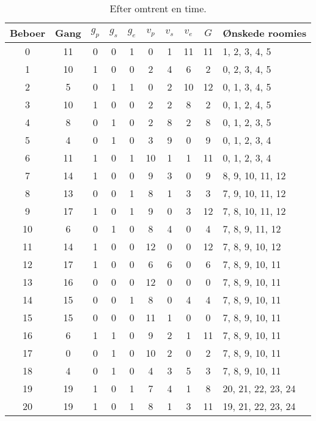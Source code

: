 \documentclass[article,oneside,11pt,a4paper]{memoir}
\newenvironment{assignment}[1]{
\begin{table}[h]
\caption{#1}
\footnotesize
\begin{center}
\begin{tabular}{cccccccccl}
\toprule
Beboer & Gang & $g_p$ & $g_s$ & $g_e$ & $v_p$ & $v_s$ & $v_e$ & $G$ & Ønskede roomies \\ \midrule
}{
\bottomrule
\end{tabular}
\end{center}
\end{table}

}
\begin{document}
\begin{assignment}{Efter omtrent en time.}
     0 &   11 &   0 &   0 &   1 &   0 &   1 &  11 & 11 &  1,  2,  3,  4,  5 \\
     1 &   10 &   1 &   0 &   0 &   2 &   4 &   6 &  2 &  0,  2,  3,  4,  5 \\
     2 &    5 &   0 &   1 &   1 &   0 &   2 &  10 & 12 &  0,  1,  3,  4,  5 \\
     3 &   10 &   1 &   0 &   0 &   2 &   2 &   8 &  2 &  0,  1,  2,  4,  5 \\
     4 &    8 &   0 &   1 &   0 &   2 &   8 &   2 &  8 &  0,  1,  2,  3,  5 \\
     5 &    4 &   0 &   1 &   0 &   3 &   9 &   0 &  9 &  0,  1,  2,  3,  4 \\
     6 &   11 &   1 &   0 &   1 &  10 &   1 &   1 & 11 &  0,  1,  2,  3,  4 \\ \midrule
     7 &   14 &   1 &   0 &   0 &   9 &   3 &   0 &  9 &  8,  9, 10, 11, 12 \\
     8 &   13 &   0 &   0 &   1 &   8 &   1 &   3 &  3 &  7,  9, 10, 11, 12 \\
     9 &   17 &   1 &   0 &   1 &   9 &   0 &   3 & 12 &  7,  8, 10, 11, 12 \\
    10 &    6 &   0 &   1 &   0 &   8 &   4 &   0 &  4 &  7,  8,  9, 11, 12 \\
    11 &   14 &   1 &   0 &   0 &  12 &   0 &   0 & 12 &  7,  8,  9, 10, 12 \\
    12 &   17 &   1 &   0 &   0 &   6 &   6 &   0 &  6 &  7,  8,  9, 10, 11 \\
    13 &   16 &   0 &   0 &   0 &  12 &   0 &   0 &  0 &  7,  8,  9, 10, 11 \\
    14 &   15 &   0 &   0 &   1 &   8 &   0 &   4 &  4 &  7,  8,  9, 10, 11 \\
    15 &   15 &   0 &   0 &   0 &  11 &   1 &   0 &  0 &  7,  8,  9, 10, 11 \\
    16 &    6 &   1 &   1 &   0 &   9 &   2 &   1 & 11 &  7,  8,  9, 10, 11 \\
    17 &    0 &   0 &   1 &   0 &  10 &   2 &   0 &  2 &  7,  8,  9, 10, 11 \\
    18 &    4 &   0 &   1 &   0 &   4 &   3 &   5 &  3 &  7,  8,  9, 10, 11 \\ \midrule
    19 &   19 &   1 &   0 &   1 &   7 &   4 &   1 &  8 & 20, 21, 22, 23, 24 \\
    20 &   19 &   1 &   0 &   1 &   8 &   1 &   3 & 11 & 19, 21, 22, 23, 24 \\

\end{assignment}
\end{document}
